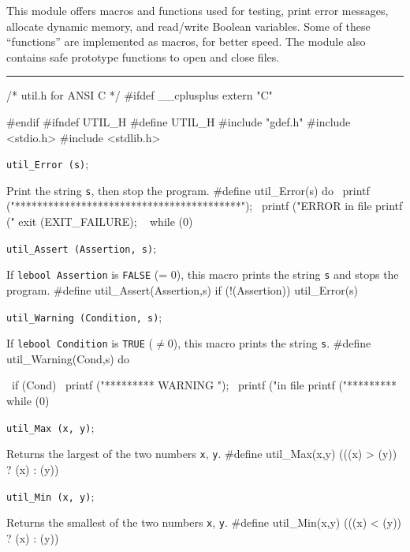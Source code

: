 
This module offers macros and functions used for testing, print error messages,
allocate dynamic memory, and read/write Boolean variables.
Some of these ``functions'' are implemented as macros, for better speed.
The module also contains safe prototype functions to open and close files.


\bigskip\hrule

\code\hide
/* util.h  for ANSI C */
#ifdef __cplusplus
extern "C" {
#endif
#ifndef UTIL_H
#define UTIL_H
\endhide
#include "gdef.h"
#include <stdio.h>
#include <stdlib.h>
\endcode


\noindent
{\tt util\_Error (s)};

 \tab  Print the string {\tt s}, then stop the program.
 \endtab
\code
\hide
#define util_Error(s) do { \
   printf ("\n\n******************************************\n"); \
   printf ("ERROR in file %
   printf ("%
   exit (EXIT_FAILURE); \
   } while (0)
\endhide
\endcode

\noindent
{\tt util\_Assert (Assertion, s)};

 \tab  If {\tt lebool Assertion} is {\tt FALSE} (= 0),
  this macro prints the string {\tt s} and stops the program.
 \endtab
\code
\hide
#define util_Assert(Assertion,s) if (!(Assertion)) util_Error(s)
\endhide
\endcode

\noindent
{\tt util\_Warning (Condition, s)};

 \tab  If {\tt lebool Condition} is {\tt TRUE} ($\not = 0$),
 this macro prints the string {\tt s}.
 \endtab
\code
\hide
#define util_Warning(Cond,s) do { \
   if (Cond) { \
      printf ("*********  WARNING "); \
      printf ("in file  %
      printf ("*********  %
   } while (0)
\endhide
\endcode

\noindent
{\tt util\_Max (x, y)};

 \tab  Returns the largest of the two numbers {\tt  x}, {\tt y}.
 \endtab
\code
\hide
#define util_Max(x,y) (((x) > (y)) ? (x) : (y))
\endhide
\endcode

\noindent
{\tt util\_Min (x, y)};

 \tab  Returns the smallest of the two numbers {\tt  x}, {\tt y}.
 \endtab
\code
\hide
#define util_Min(x,y) (((x) < (y)) ? (x) : (y))
\endhide
\endcode


}}

